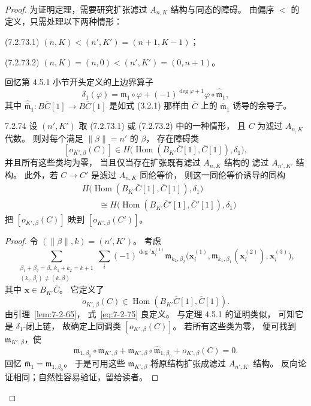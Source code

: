 \begin{proof}
为证明定理，需要研究扩张滤过 $A_{n,K}$ 结构与同态的障碍。
由偏序 $<$ 的定义，只需处理以下两种情形：

\noindent\textup{(7.2.73.1)}\quad
$(n,K)<(n',K')=(n+1,K-1)$；

\noindent\textup{(7.2.73.2)}\quad
$(n,K)=(n,0)<(n',K')=(0,n+1)$。

回忆第 4.5.1 小节开头定义的上边界算子
\[
\delta_1(\varphi)
=\overline{\mathfrak m}_1\circ\varphi
+(-1)^{\deg\varphi+1}
\varphi\circ\widehat{\overline{\mathfrak m}}_1,
\]
其中
$\widehat{\overline{\mathfrak m}}_1\colon
B\overline C[1]\to B\overline C[1]$
是如式 (3.2.1) 那样由
$\overline C$ 上的 $\overline{\mathfrak m}_1$
诱导的余导子。

\begin{lemma}{7.2.74}\label{lem:7-2-74}
设 $(n',K')$ 取
(7.2.73.1) 或 (7.2.73.2) 中的一种情形，
且 $C$ 为滤过 $A_{n,K}$ 代数。
则对每个满足 $\|\beta\|=n'$ 的 $\beta$，
存在障碍类
\[
[o_{K',\beta}(C)]\in
H\bigl(\operatorname{Hom}
(B_{K'}\overline C[1],\overline C[1]),
\delta_1\bigr),
\]
并且所有这些类均为零，
当且仅当存在扩张既有滤过 $A_{n,K}$ 结构的
滤过 $A_{n',K'}$ 结构。
此外，若 $C\to C'$ 是滤过 $A_{n,K}$ 同伦等价，
则这一同伦等价诱导的同构
\[
\begin{aligned}
&H\bigl(\operatorname{Hom}
(B_{K'}\overline C[1],\overline C[1]),\delta_1\bigr)\\
&\qquad\cong
H\bigl(\operatorname{Hom}
(B_{K'}\overline C'[1],\overline C'[1]),\delta_1\bigr)
\end{aligned}
\]
把 $[o_{K',\beta}(C)]$ 映到
$[o_{K',\beta}(C')]$。
\end{lemma}

\begin{proof}
令 $(\|\beta\|,k)=(n',K')$。
考虑
\begin{equation}
\sum_{\substack{\beta_1+\beta_2=\beta,\ k_1+k_2=k+1\\
 (k_i,\beta_i)\ne(k,\beta)}}
\sum_i(-1)^{\deg'\mathbf x_i^{(1)}}
\mathfrak m_{k_2,\beta_2}
\bigl(\mathbf x_i^{(1)},
\mathfrak m_{k_1,\beta_1}(\mathbf x_i^{(2)}),
\mathbf x_i^{(3)}\bigr),
\tag{7.2.75}\label{eq:7-2-75}
\end{equation}
其中 $\mathbf x\in B_{K'}\overline C$。
它定义了
\[
o_{K',\beta}(C)\in
\operatorname{Hom}
(B_{K'}\overline C[1],\overline C[1]).
\]
由引理~\ref{lem:7-2-65}，
式~\eqref{eq:7-2-75} 良定义。
与定理 4.5.1 的证明类似，
可知它是 $\delta_1$-闭上链，
故确定上同调类 $[o_{K',\beta}(C)]$。
若所有这些类为零，
便可找到 $\mathfrak m_{K',\beta}$，使
\begin{equation}
\mathfrak m_{1,\beta_0}\circ
\mathfrak m_{K',\beta}
+\mathfrak m_{K',\beta}\circ
\widehat{\mathfrak m}_{1,\beta_0}
+o_{K',\beta}(C)=0.
\tag{7.2.76.1}\label{eq:7-2-76-1}
\end{equation}
回忆 $\overline{\mathfrak m}_1=\mathfrak m_{1,\beta_0}$。
于是可用这些 $\mathfrak m_{K',\beta}$
将原结构扩张成滤过 $A_{n',K'}$ 结构。
反向论证相同；自然性容易验证，留给读者。
\end{proof}


\end{proof}
